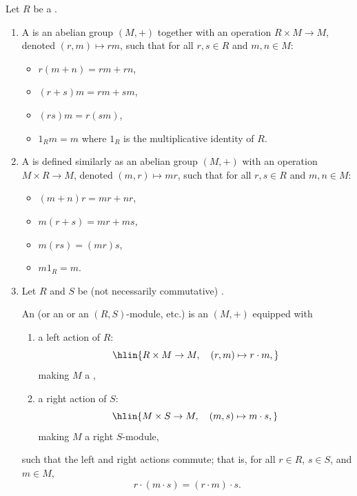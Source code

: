 \begin{definition} \label{definition:bimodule_over_rings_module_over_a_ring}
Let $R$ be a . 
\begin{enumerate}
    \item A  is an abelian group $(M,+)$ together with an operation $R \times M \to M$, denoted $(r,m) \mapsto rm$, such that for all $r,s \in R$ and $m,n \in M$:
    \begin{itemize}
        \item $r(m+n) = rm + rn$,
        \item $(r+s)m = rm + sm$,
        \item $(rs)m = r(sm)$,
        \item $1_R m = m$ where $1_R$ is the multiplicative identity of $R$.
    \end{itemize}

    \item A  is defined similarly as an abelian group $(M,+)$ with an operation $M \times R \to M$, denoted $(m,r) \mapsto mr$, such that for all $r,s \in R$ and $m,n \in M$:
    \begin{itemize}
        \item $(m+n)r = mr + nr$,
        \item $m(r+s) = mr + ms$,
        \item $m(rs) = (mr)s$,
        \item $m 1_R = m$.
    \end{itemize}

    \item Let $R$ and $S$ be  (not necessarily commutative) .

    An  (or an  or an $(R,S)$-module, etc.) is an  $(M,+)$ equipped with
    \begin{enumerate}
        \item a left action of $R$:
        $$\hlin{R \times M \to M, \quad (r,m) \mapsto r \cdot m,}$$
        making $M$ a ,
        \item a right action of $S$:
        $$\hlin{M \times S \to M, \quad (m,s) \mapsto m \cdot s,}$$
        making $M$ a right $S$-module,
    \end{enumerate}
    such that the left and right actions commute; that is, for all $r \in R$, $s \in S$, and $m \in M$,
    $$ r \cdot (m \cdot s) = (r \cdot m) \cdot s.  $$


\end{enumerate}
\end{definition}
